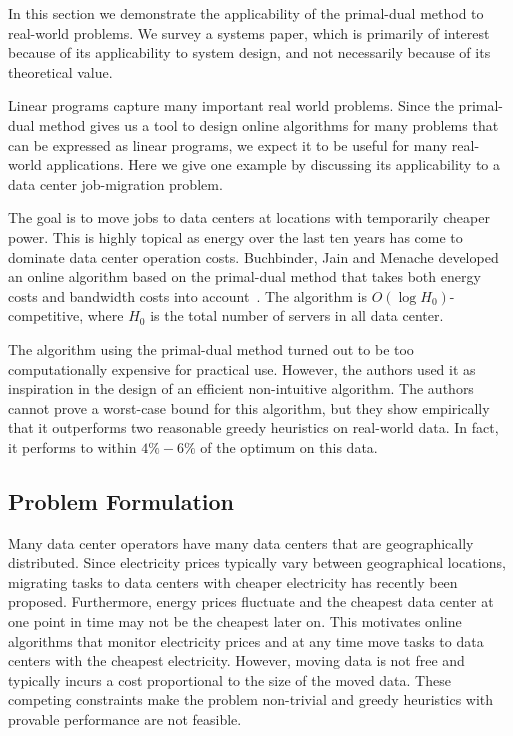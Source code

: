 In this section we demonstrate the applicability of the primal-dual method to real-world problems.
We survey a systems paper, which is primarily of interest because of its applicability to system design, and not necessarily because of its theoretical value.

Linear programs capture many important real world problems. 
Since the primal-dual method gives us a tool to design online algorithms for many problems that can be expressed as linear programs, we expect it to be useful for many real-world applications.
Here we give one example by discussing its applicability to a data center job-migration problem.

The goal is to move jobs to data centers at locations with temporarily cheaper power.
This is highly topical as energy over the last ten years has come to dominate data center operation costs.
Buchbinder, Jain and Menache developed an online algorithm based on the primal-dual method that takes both energy costs and bandwidth costs into account~\cite{buchbinder11:job-migration,buchbinder11:job-migration-techreport}.
The algorithm is $O(\log H_0)$-competitive, where $H_0$ is the total number of servers in all data center.

The algorithm using the primal-dual method turned out to be too computationally expensive for practical use.
However, the authors used it as inspiration in the design of an efficient non-intuitive algorithm.
The authors cannot prove a worst-case bound for this algorithm, but they show empirically that it outperforms two reasonable greedy heuristics on real-world data.
In fact, it performs to within $4\%-6\%$ of the optimum on this data.

\subsection{Problem Formulation}

Many data center operators have many data centers that are geographically distributed.
Since electricity prices typically vary between geographical locations, migrating tasks to data centers with cheaper electricity has recently been proposed.
Furthermore, energy prices fluctuate and the cheapest data center at one point in time may not be the cheapest later on.
This motivates online algorithms that monitor electricity prices and at any time move tasks to data centers with the cheapest electricity.
However, moving data is not free and typically incurs a cost proportional to the size of the moved data.
These competing constraints make the problem non-trivial and greedy heuristics with provable performance are not feasible.

